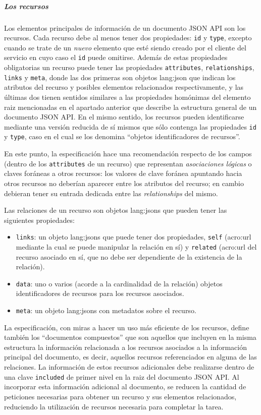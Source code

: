 \subparagraph{Los recursos}

Los elementos principales de información de un documento JSON API son los recursos. Cada recurso debe al menos tener dos propiedades: \texttt{id} y \texttt{type}, excepto cuando se trate de un \textit{nuevo} elemento que esté siendo creado por el cliente del servicio en cuyo caso el \texttt{id} puede omitirse. Además de estas propiedades obligatorias un recurso puede tener las propiedades \texttt{attributes}, \texttt{relationships}, \texttt{links} y \texttt{meta}, donde las dos primeras son objetos \gls{lang:json} que indican los atributos del recurso y posibles elementos relacionados respectivamente, y las últimas dos tienen sentidos similares a las propiedades homónimas del elemento raiz mencionadas en el apartado anterior que describe la estructura general de un documento JSON API. En el mismo sentido, los recursos pueden identificarse mediante una versión reducida de sí mismos que sólo contenga las propiedades \texttt{id} y \texttt{type}, caso en el cual se los denomina ``objetos identificadores de recursos''.

En este punto, la especificación hace una recomendación respecto de los campos (dentro de los \texttt{attributes} de un recurso) que representan \textit{asociaciones lógicas} o claves foráneas a otros recursos: los valores de clave foránea apuntando hacia otros recursos no deberían aparecer entre los atributos del recurso; en cambio debieran tener su entrada dedicada entre las \textit{relationships} del mismo.

Las relaciones de un recurso son objetos \glspl{lang:json} que pueden tener las siguientes propiedades:

\begin{itemize}
  \item \texttt{links}: un objeto \glspl{lang:json} que puede tener dos propiedades, \texttt{self} (\gls{acro:url} mediante la cual se puede manipular la relación en sí) y \texttt{related} (\gls{acro:url} del recurso asociado en sí, que no debe ser dependiente de la existencia de la relación).
  \item \texttt{data}: uno o varios (acorde a la cardinalidad de la relación) objetos identificadores de recursos para los recursos asociados.
  \item \texttt{meta}: un objeto \glspl{lang:json} con metadatos sobre el recurso.
\end{itemize}

La especificación, con miras a hacer un uso más eficiente de los recursos, define también los ``documentos compuestos'' que son aquellos que incluyen en la misma estructura la información relacionada a los recursos asociados a la información principal del documento, es decir, aquellos recursos referenciados en alguna de las relaciones. La información de estos recursos adicionales debe realizarse dentro de una clave \texttt{included} de primer nivel en la raiz del documento JSON API. Al incorporar esta información adicional al documento, se reducen la cantidad de peticiones necesarias para obtener un recurso y sus elementos relacionados, reduciendo la utilización de recursos necesaria para completar la tarea.

